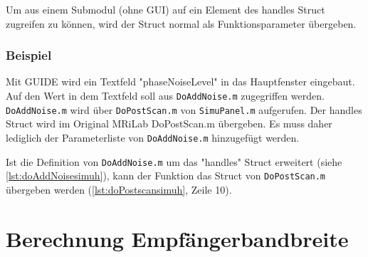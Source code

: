 Um aus einem Submodul (ohne GUI) auf ein Element des handles Struct zugreifen zu können, wird der Struct normal als Funktionsparameter übergeben.

\subsubsection{Beispiel}
Mit GUIDE wird ein Textfeld "phaseNoiseLevel" in das Hauptfenster eingebaut.
Auf den Wert in dem Textfeld soll aus \texttt{DoAddNoise.m} zugegriffen werden. \texttt{DoAddNoise.m} wird über \texttt{DoPostScan.m} von \texttt{SimuPanel.m} aufgerufen. Der handles Struct wird im Original MRiLab DoPostScan.m übergeben. Es muss daher lediglich der Parameterliste von \texttt{DoAddNoise.m} hinzugefügt werden.


Ist die Definition von \texttt{DoAddNoise.m} um das "handles" Struct erweitert (siehe \autoref{lst:doAddNoisesimuh}), kann der Funktion das Struct von \texttt{DoPostScan.m} übergeben werden (\autoref{lst:doPostscansimuh}, Zeile 10).



\section{Berechnung Empfängerbandbreite}

